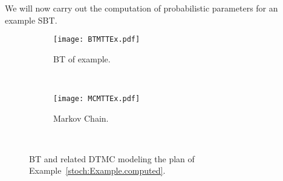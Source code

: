 We will now carry out the computation of probabilistic parameters for an example SBT.
\label{stoch:Example.computed}
\begin{figure}
        \centering
        \begin{subfigure}[b]{0.4\columnwidth}
                \centering
                \texttt{[image: BTMTTEx.pdf]}
                \caption{BT of example.}
                \label{stoch:Example.Tree}
        \end{subfigure}%
        ~ %
        \begin{subfigure}[b]{0.6\columnwidth}
                \centering
                \texttt{[image: MCMTTEx.pdf]}
                \caption{Markov Chain.}   
                \label{stoch:Example.MC}           
        \end{subfigure}
        ~ %
        \caption{BT and related DTMC modeling the plan of Example~\ref{stoch:Example.computed}.}
\end{figure}
